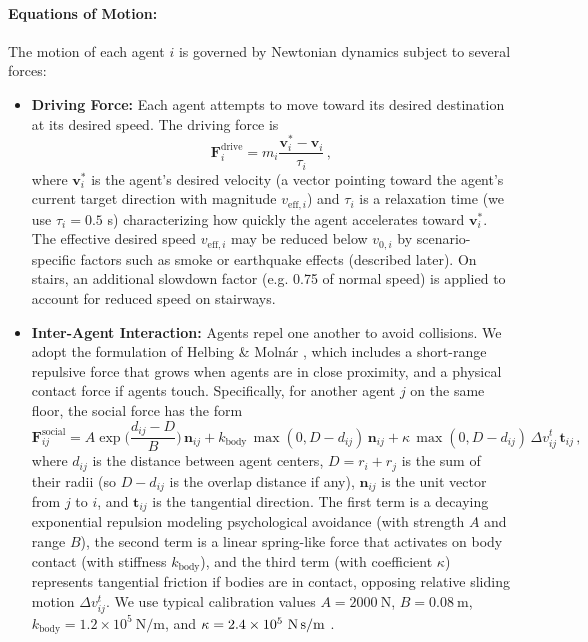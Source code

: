 \documentclass[11pt,a4paper]{article}
\begin{document}
\paragraph{Equations of Motion:} The motion of each agent $i$ is governed by Newtonian dynamics subject to several forces:
\begin{itemize}
    \item \textbf{Driving Force:} Each agent attempts to move toward its desired destination at its desired speed. The driving force is 
    \begin{equation}
        \mathbf{F}_i^{\text{drive}} = m_i \frac{\mathbf{v}_i^{*} - \mathbf{v}_i}{\tau_i}\,,
    \end{equation}
    where $\mathbf{v}_i^{*}$ is the agent's desired velocity (a vector pointing toward the agent's current target direction with magnitude $v_{\text{eff},i}$) and $\tau_i$ is a relaxation time (we use $\tau_i=0.5$ s) characterizing how quickly the agent accelerates toward $\mathbf{v}_i^*$. The effective desired speed $v_{\text{eff},i}$ may be reduced below $v_{0,i}$ by scenario-specific factors such as smoke or earthquake effects (described later). On stairs, an additional slowdown factor (e.g. 0.75 of normal speed) is applied to account for reduced speed on stairways.
    \item \textbf{Inter-Agent Interaction:} Agents repel one another to avoid collisions. We adopt the formulation of Helbing \& Moln\'ar \cite{helbing1995}, which includes a short-range repulsive force that grows when agents are in close proximity, and a physical contact force if agents touch. Specifically, for another agent $j$ on the same floor, the social force has the form 
    \[
       \mathbf{F}_{ij}^{\text{social}} = A \exp\!\Big(\frac{d_{ij}-D}{B}\Big)\, \mathbf{n}_{ij} 
       + k_{\text{body}}\, \max(0, D - d_{ij})\, \mathbf{n}_{ij} 
       + \kappa\, \max(0, D - d_{ij})\, \Delta v_{ij}^{t}\, \mathbf{t}_{ij}\,,
    \] 
    where $d_{ij}$ is the distance between agent centers, $D = r_i + r_j$ is the sum of their radii (so $D-d_{ij}$ is the overlap distance if any), $\mathbf{n}_{ij}$ is the unit vector from $j$ to $i$, and $\mathbf{t}_{ij}$ is the tangential direction. The first term is a decaying exponential repulsion modeling psychological avoidance (with strength $A$ and range $B$), the second term is a linear spring-like force that activates on body contact (with stiffness $k_{\text{body}}$), and the third term (with coefficient $\kappa$) represents tangential friction if bodies are in contact, opposing relative sliding motion $\Delta v_{ij}^{t}$. We use typical calibration values $A=2000~\text{N}$, $B=0.08~\text{m}$, $k_{\text{body}}=1.2\times10^5~\text{N/m}$, and $\kappa=2.4\times10^5~\text{N\,s/m}$ \cite{helbing2000}.

\end{itemize}
\end{document}
